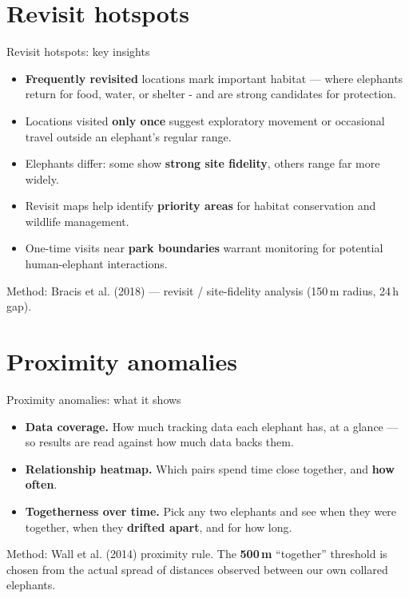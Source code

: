 \documentclass{beamer}
\newcommand{\hi}[1]{\textbf{\textcolor{hicolor}{#1}}}
\begin{document}
	
	
	
	\section{Revisit hotspots}
	
	\begin{frame}{Revisit hotspots: key insights}
		\small
		\setlength{\itemsep}{6pt}
		\begin{itemize}
			\item \hi{Frequently revisited} locations mark important habitat --- where
			elephants return for food, water, or shelter - and are strong candidates
			for protection.
			\item Locations visited \hi{only once} suggest exploratory movement or
			occasional travel outside an elephant's regular range.
			\item Elephants differ: some show \hi{strong site fidelity}, others range
			far more widely.
			\item Revisit maps help identify \hi{priority areas} for habitat conservation
			and wildlife management.
			\item One-time visits near \hi{park boundaries} warrant monitoring for
			potential human-elephant interactions.
		\end{itemize}
		\vfill
		{\footnotesize Method: Bracis et al. (2018) --- revisit / site-fidelity analysis
			(150\,m radius, 24\,h gap).}
	\end{frame}
	





	\section{Proximity anomalies}
	
	\begin{frame}{Proximity anomalies: what it shows}
		\small
		\setlength{\itemsep}{7pt}
		\begin{itemize}
			\item \textbf{Data coverage.} How much tracking data each elephant has, at a
			glance --- so results are read against how much data backs them.
			\item \textbf{Relationship heatmap.} Which pairs spend time close together,
			and \hi{how often}.
			\item \textbf{Togetherness over time.} Pick any two elephants and see when they
			were together, when they \hi{drifted apart}, and for how long.
		\end{itemize}
		\vfill
		{\footnotesize Method: Wall et al. (2014) proximity rule. The
			\hi{500\,m} ``together'' threshold is chosen from the actual spread of distances
			observed between our own collared elephants.}
	\end{frame}
	
\end{document}
